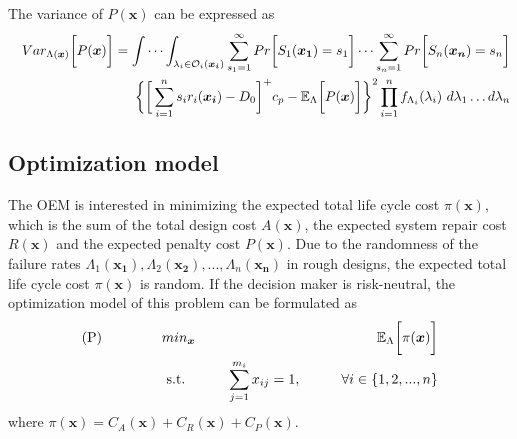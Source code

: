 \documentclass[preprint,12pt]{elsarticle}
\begin{document}
The variance of $P(\boldsymbol{x})$ can be expressed as
\begin{eqnarray}
&&Var_{\Lambda(\boldsymbol{x})} \bigg[ P(\boldsymbol{x}) \bigg]=
\idotsint_{\lambda_{i} \in \mathcal{O}_{i}(\boldsymbol{x_{i}})} \sum_{s_{1}=1}^{\infty}{ Pr\bigg[S_{1}(\boldsymbol{x_{1}})=s_{1}\bigg]}\dots\sum_{s_{n}=1} ^{\infty}{Pr\bigg[S_{n}(\boldsymbol{x_{n}})=s_{n}\bigg]}\nonumber\\
&&\bigg\{\bigg[\sum_{i=1}^{n}{s_{i}r_{i}(\boldsymbol{x_{i}})}-D_{0}\bigg]^{+}c_{p} -\mathbb{E}_{\Lambda} \bigg[ P(\boldsymbol{x}) \bigg]\bigg\}^{2} \prod_{i=1}^{n} f_{\Lambda_{i}}(\lambda_{i}) \ d\lambda_{1}\dots d\lambda_{n}
\end{eqnarray}

\subsection{Optimization model}
The OEM is interested in minimizing the expected total life cycle cost $\pi(\boldsymbol{x})$, which is the sum of the total design cost $A(\boldsymbol{x})$, the expected system repair cost $R(\boldsymbol{x})$ and the expected penalty cost $P(\boldsymbol{x})$. Due to the randomness of the failure rates $\Lambda_{1}(\boldsymbol{x_{1}}),\Lambda_{2}(\boldsymbol{x_{2}}),...,\Lambda_{n}(\boldsymbol{x_{n}})$ in rough designs, the expected total life cycle cost $\pi(\boldsymbol{x})$ is random. If the decision maker is risk-neutral, the optimization model of this problem can be formulated as
\begin{eqnarray}
\text{(P)} \hspace{15mm} & min_{\boldsymbol{x}} & \hspace{10mm} \mathbb{E}_{\Lambda} \bigg[ \pi(\boldsymbol{x})\bigg] \nonumber\\
& \text{ s.t. }&  \hspace{5mm} \sum_{j=1}^{m_i}{x_{ij}}=1, \hspace{10mm} \forall i \in \{1,2,...,n\} \nonumber
\end{eqnarray}
where $\pi(\boldsymbol{x})=C_{A}(\boldsymbol{x})+C_{R}(\boldsymbol{x})+C_{P}(\boldsymbol{x})$.
\end{document}
